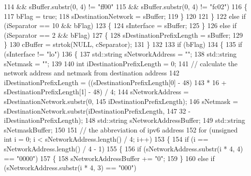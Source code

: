 \begin{DoxyCode}
114                         && sBuffer.substr(0, 4) != \textcolor{stringliteral}{"ff00"}
115                         && sBuffer.substr(0, 4) != \textcolor{stringliteral}{"fc02"})
116                 \{
117                     bFlag = \textcolor{keyword}{true};
118                     sDestinationNetwork = sBuffer;
119                 \}
120 
121             \}
122             \textcolor{keywordflow}{else} \textcolor{keywordflow}{if} (iSeparator == 10 && bFlag)
123             \{
124                 sInterface = sBuffer;
125             \}
126             \textcolor{keywordflow}{else} \textcolor{keywordflow}{if} (iSeparator == 2 && bFlag)
127             \{
128                 sDestinationPrefixLength = sBuffer;
129             \}
130             cBuffer = strtok(NULL, cSeparator);
131         \}
132 
133         \textcolor{keywordflow}{if} (bFlag)
134         \{
135             \textcolor{keywordflow}{if} (sInterface != \textcolor{stringliteral}{"lo"})
136             \{
137                 std::string sNetworkAddress = \textcolor{stringliteral}{""};
138                 std::string sNetmask = \textcolor{stringliteral}{""};
139 
140                 \textcolor{keywordtype}{int} iDestinationPrefixLength = 0;
141                 \textcolor{comment}{// calculate the network address and netmask from destination address}
142                 iDestinationPrefixLength = ((sDestinationPrefixLength[0] - 48)
143                         * 16 + sDestinationPrefixLength[1] - 48) / 4;
144                 sNetworkAddress = sDestinationNetwork.substr(0,
145                         iDestinationPrefixLength);
146                 sNetmask = sDestinationNetwork.substr(iDestinationPrefixLength,
147                         32 - iDestinationPrefixLength);
148                 std::string sNetworkAddressBuffer;
149                 std::string sNetmaskBuffer;
150 
151                 \textcolor{comment}{// the abbreviation of ipv6 address}
152                 \textcolor{keywordflow}{for} (\textcolor{keywordtype}{unsigned} \textcolor{keywordtype}{int} i = 0; i < sNetworkAddress.length() / 4; i++)
153                 \{
154                     \textcolor{keywordflow}{if} (i == sNetworkAddress.length() / 4 - 1)
155                     \{
156                         \textcolor{keywordflow}{if} (sNetworkAddress.substr(i * 4, 4) == \textcolor{stringliteral}{"0000"})
157                         \{
158                             sNetworkAddressBuffer += \textcolor{stringliteral}{"0"};
159                         \}
160                         \textcolor{keywordflow}{else} \textcolor{keywordflow}{if} (sNetworkAddress.substr(i * 4, 3) == \textcolor{stringliteral}{"000"})

\end{DoxyCode}
